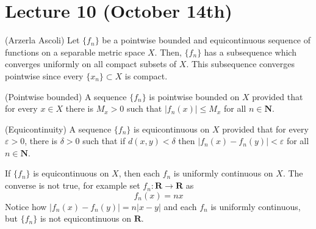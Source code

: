 \section{Lecture 10 (October 14th)}
\begin{thm}
(Arzerla Ascoli) Let $\{f_{n}\}$ be a pointwise bounded and equicontinuous sequence of functions on a separable metric space $X$. Then, $\{f_{n}\}$ has a subsequence which converges uniformly on all compact subsets of $X$. This subsequence converges pointwise since every $\{x_{n}\}\subset X$ is compact. 
\end{thm}
\vspace{2ex}
\begin{defi}
(Pointwise bounded) A sequence $\{f_{n}\}$ is pointwise bounded on $X$ provided that for every $x\in X$ there is $M_{x}>0$ such that $|f_{n}(x)|\leq M_{x}$ for all $n\in {\bm N}$. 
\end{defi}
\vspace{2ex}
\begin{defi}
(Equicontinuity) A sequence $\{f_{n}\}$ is equicontinuous on $X$ provided that for every $\varepsilon >0$, there is $\delta >0$ such that if $d(x,y)<\delta $ then $|f_{n}(x)-f_{n}(y)|<\varepsilon $ for all $n\in {\bm N}$.
\end{defi}
\vspace{2ex}
\begin{rmk}
If $\{f_{n}\}$ is equicontinuous on $X$, then each $f_{n}$ is uniformly continuous on $X$. The converse is not true, for example set $f_{n}:{\bm R}\rightarrow {\bm R}$ as 
\[f_{n}(x)=nx\]
Notice how $|f_{n}(x)-f_{n}(y)|=n|x-y|$ and each $f_{n}$ is uniformly continuous, but $\{f_{n}\}$ is not equicontinuous on ${\bm R}$.
\end{rmk}
\vspace{2ex}
